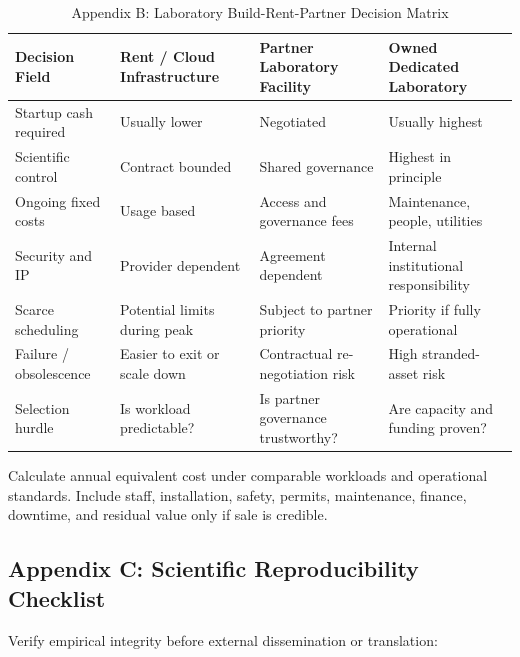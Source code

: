 \begin{table}[t]
\centering
\small
\caption{Appendix B: Laboratory Build-Rent-Partner Decision Matrix}
\label{tab:app_b_lab}
\begin{tabularx}{\textwidth}{p{3.2cm} X X X}
\toprule
\textbf{Decision Field} & \textbf{Rent / Cloud Infrastructure} & \textbf{Partner Laboratory Facility} & \textbf{Owned Dedicated Laboratory} \\
\midrule
Startup cash required & Usually lower & Negotiated & Usually highest \\
Scientific control & Contract bounded & Shared governance & Highest in principle \\
Ongoing fixed costs & Usage based & Access and governance fees & Maintenance, people, utilities \\
Security and IP & Provider dependent & Agreement dependent & Internal institutional responsibility \\
Scarce scheduling & Potential limits during peak & Subject to partner priority & Priority if fully operational \\
Failure / obsolescence & Easier to exit or scale down & Contractual re-negotiation risk & High stranded-asset risk \\
Selection hurdle & Is workload predictable? & Is partner governance trustworthy? & Are capacity and funding proven? \\
\bottomrule
\end{tabularx}
\end{table}

Calculate annual equivalent cost under comparable workloads and operational standards. Include staff, installation, safety, permits, maintenance, finance, downtime, and residual value only if sale is credible.

\subsection{Appendix C: Scientific Reproducibility Checklist}

Verify empirical integrity before external dissemination or translation:


